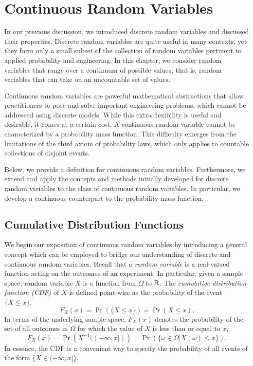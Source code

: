 \chapter{Continuous Random Variables}

In our previous discussion, we introduced discrete random variables and discussed their properties.
Discrete random variables are quite useful in many contexts, yet they form only a small subset of the collection of random variables pertinent to applied probability and engineering.
In this chapter, we consider random variables that range over a continuum of possible values; that is, random variables that can take on an uncountable set of values.

Continuous random variables are powerful mathematical abstractions that allow practitioners to pose and solve important engineering problems, which cannot be addressed using discrete models.
While this extra flexibility is useful and desirable, it comes at a certain cost.
A continuous random variable cannot be characterized by a probability mass function.
This difficulty emerges from the limitations of the third axiom of probability laws, which only applies to countable collections of disjoint events.

Below, we provide a definition for continuous random variables.
Furthermore, we extend and apply the concepts and methods initially developed for discrete random variables to the class of continuous random variables.
In particular, we develop a continuous counterpart to the probability mass function.


\section{Cumulative Distribution Functions}

We begin our exposition of continuous random variables by introducing a general concept which can be employed to bridge our understanding of discrete and continuous random variables.
Recall that a \emph{random variable} is a real-valued function acting on the outcomes of an experiment. 
In particular, given a sample space, random variable $X$ is a function from $\Omega$ to $\mathbb{R}$.
The \emph{cumulative distribution function (CDF)} of $X$ is defined point-wise as the probability of the event $\{X \leq x \}$, 
\begin{equation*}
F_X (x) = \Pr ( \{ X \leq x \} ) = \Pr (X \leq x).
\end{equation*}
In terms of the underlying sample space, $F_X (x)$ denotes the probability of the set of all outcomes in $\Omega$ for which the value of $X$ is less than or equal to $x$,
\begin{equation*}
F_X (x) = \Pr \left( X^{-1} ( (- \infty, x]) \right)
= \Pr (\{ \omega \in \Omega | X(\omega) \leq x \}).
\end{equation*}
In essence, the CDF is a convenient way to specify the probability of all events of the form $\{ X \in (-\infty, x] \}$.

